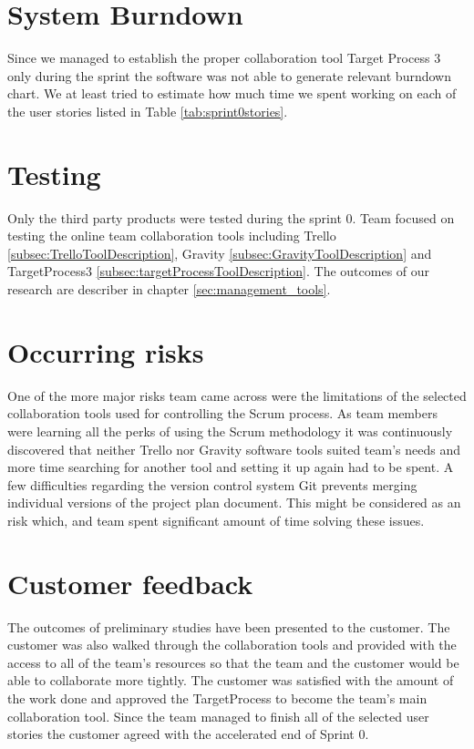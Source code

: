 \section{System Burndown}
Since we managed to establish the proper collaboration tool Target Process 3 only during the sprint the software was not able to generate relevant burndown chart.
We at least tried to estimate how much time we spent working on each of the user stories listed in Table \ref{tab:sprint0stories}.

\section{Testing}

Only the third party products were tested during the sprint 0. Team focused on testing the online team collaboration tools including Trello \ref{subsec:TrelloToolDescription}, Gravity \ref{subsec:GravityToolDescription} and TargetProcess3 \ref{subsec:targetProcessToolDescription}. The outcomes of our research are describer in chapter \ref{sec:management_tools}.

\section{Occurring risks}

One of the more major risks team came across were the limitations of the selected collaboration tools used for controlling the Scrum process. As team members were learning all the perks of using the Scrum methodology it was continuously discovered that neither Trello nor Gravity software tools suited team's needs and more time searching for another tool and setting it up again had to be spent. A few difficulties regarding the version control system Git prevents merging individual versions of the project plan document. This might be considered as an risk which, and team spent significant amount of time solving these issues.

\section{Customer feedback}

The outcomes of preliminary studies have been presented to the customer. The customer was also walked through the collaboration tools and provided with the access to all of the team's resources so that the team and the customer would be able to collaborate more tightly. The customer was satisfied with the amount of the work done and approved the TargetProcess to become the team's main collaboration tool. Since the team managed to finish all of the selected user stories the customer agreed with the accelerated end of Sprint 0.

